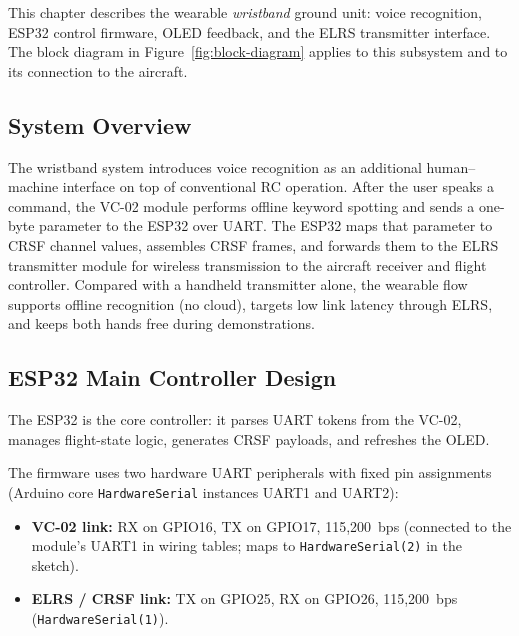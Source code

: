 This chapter describes the wearable \emph{wristband} ground unit: voice recognition, ESP32
control firmware, OLED feedback, and the ELRS transmitter interface.
The block diagram in Figure~\ref{fig:block-diagram} applies to this subsystem and to its
connection to the aircraft.

\subsection{System Overview}
\label{subsec:wristband-overview}

The wristband system introduces voice recognition as an additional human--machine interface on
top of conventional RC operation.
After the user speaks a command, the VC-02 module performs offline keyword spotting and sends a
one-byte parameter to the ESP32 over UART.
The ESP32 maps that parameter to CRSF channel values, assembles CRSF frames, and forwards them
to the ELRS transmitter module for wireless transmission to the aircraft receiver and flight
controller.
Compared with a handheld transmitter alone, the wearable flow supports offline recognition (no
cloud), targets low link latency through ELRS, and keeps both hands free during demonstrations.

\subsection{ESP32 Main Controller Design}
\label{subsec:voice}

The ESP32 is the core controller: it parses UART tokens from the VC-02, manages flight-state logic,
generates CRSF payloads, and refreshes the OLED.

The firmware uses two hardware UART peripherals with fixed pin assignments (Arduino core
\texttt{HardwareSerial} instances UART1 and UART2):
\begin{itemize}
    \item \textbf{VC-02 link:} RX on GPIO16, TX on GPIO17, 115,200~bps (connected to the module's
          UART1 in wiring tables; maps to \texttt{HardwareSerial(2)} in the sketch).
    \item \textbf{ELRS / CRSF link:} TX on GPIO25, RX on GPIO26, 115,200~bps (\texttt{HardwareSerial(1)}).
\end{itemize}


